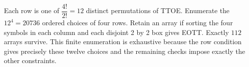 Each row is one of $\dfrac{4!}{2!}=12$ distinct permutations of TTOE. Enumerate the $12^4=20736$ ordered choices of four rows. Retain an array if sorting the four symbols in each column and each disjoint 2 by 2 box gives EOTT. Exactly $\boxed{112}$ arrays survive. This finite enumeration is exhaustive because the row condition gives precisely these twelve choices and the remaining checks impose exactly the other constraints.
